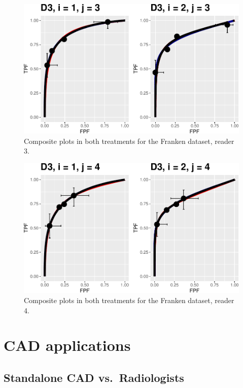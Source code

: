 \documentclass[
]{book}
\begin{document}
\begin{figure}
\centering
\includegraphics{12-rsm-3-fits_files/figure-latex/rsm-3-fits-plots-fr-1-3-1.pdf}
\caption{\label{fig:rsm-3-fits-plots-fr-1-3}Composite plots in both treatments for the Franken dataset, reader 3.}
\end{figure}

\begin{figure}
\centering
\includegraphics{12-rsm-3-fits_files/figure-latex/rsm-3-fits-plots-fr-1-4-1.pdf}
\caption{\label{fig:rsm-3-fits-plots-fr-1-4}Composite plots in both treatments for the Franken dataset, reader 4.}
\end{figure}

\hypertarget{part-cad-applications}{%
\part*{CAD applications}\label{part-cad-applications}}

\hypertarget{standalone-cad-radiologists}{%
\chapter{Standalone CAD vs.~Radiologists}\label{standalone-cad-radiologists}}
\end{document}
